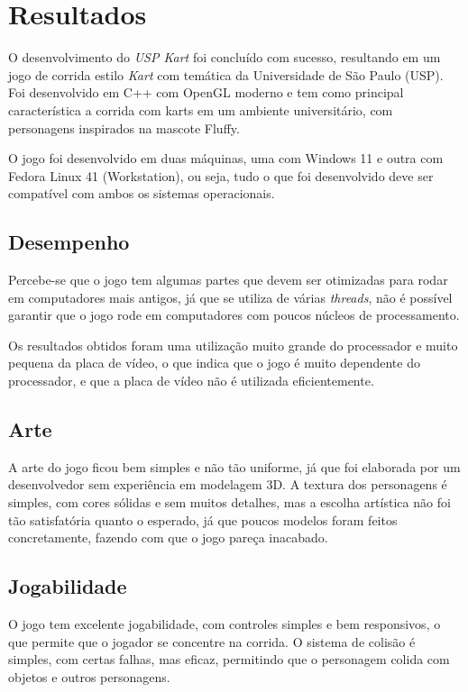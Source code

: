\chapter{Resultados}

O desenvolvimento do \textit{USP Kart} foi concluído com sucesso, resultando em um jogo de corrida estilo \textit{Kart} com temática da Universidade de São Paulo (USP). Foi desenvolvido em C++ com OpenGL moderno e tem como principal característica a corrida com karts em um ambiente universitário, com personagens inspirados na mascote Fluffy.

O jogo foi desenvolvido em duas máquinas, uma com Windows 11 e outra com Fedora Linux 41 (Workstation), ou seja, tudo o que foi desenvolvido deve ser compatível com ambos os sistemas operacionais.

\section{Desempenho}

Percebe-se que o jogo tem algumas partes que devem ser otimizadas para rodar em computadores mais antigos, já que se utiliza de várias \textit{threads}, não é possível garantir que o jogo rode em computadores com poucos núcleos de processamento.

Os resultados obtidos foram uma utilização muito grande do processador e muito pequena da placa de vídeo, o que indica que o jogo é muito dependente do processador, e que a placa de vídeo não é utilizada eficientemente.

\section{Arte}

A arte do jogo ficou bem simples e não tão uniforme, já que foi elaborada por um desenvolvedor sem experiência em modelagem 3D. A textura dos personagens é simples, com cores sólidas e sem muitos detalhes, mas a escolha artística não foi tão satisfatória quanto o esperado, já que poucos modelos foram feitos concretamente, fazendo com que o jogo pareça inacabado.

\section{Jogabilidade}

O jogo tem excelente jogabilidade, com controles simples e bem responsivos, o que permite que o jogador se concentre na corrida. O sistema de colisão é simples, com certas falhas, mas eficaz, permitindo que o personagem colida com objetos e outros personagens.

